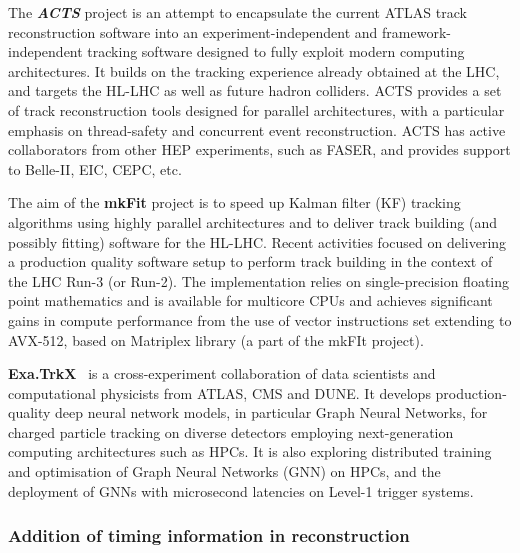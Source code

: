 The \emph{\textbf{ACTS}} project \cite{Ai:2019kze,Gumpert_2017} is an attempt to encapsulate
the current ATLAS track reconstruction software into an
experiment-independent and framework-independent tracking software
designed to fully exploit modern computing architectures. It builds on
the tracking experience already obtained at the LHC, and targets the
HL-LHC as well as future hadron colliders. ACTS provides a set of track
reconstruction tools designed for parallel architectures, with a
particular emphasis on thread-safety and concurrent event
reconstruction. ACTS has active collaborators from other HEP
experiments, such as FASER, and provides support to Belle-II, EIC, CEPC,
etc.

The aim of the \textbf{mkFit} project is to speed up Kalman filter (KF)
tracking algorithms using highly parallel architectures and to deliver
track building (and possibly fitting) software for the HL-LHC. Recent
activities focused on delivering a production quality software setup to
perform track building in the context of the LHC Run-3 (or Run-2). The
implementation relies on single-precision floating point mathematics and is
available for multicore CPUs and achieves significant gains in compute
performance from the use of vector instructions set extending to
AVX-512, based on Matriplex library (a part of the mkFIt project).

\textbf{Exa.TrkX}~\cite{Ju:2020xty} is a cross-experiment collaboration of data scientists
and computational physicists from ATLAS, CMS and DUNE. It develops
production-quality deep neural network models, in particular Graph
Neural Networks, for charged particle tracking on diverse detectors
employing next-generation computing architectures such as HPCs. It is
also exploring distributed training and optimisation of Graph Neural
Networks (GNN) on HPCs, and the deployment of GNNs with microsecond
latencies on Level-1 trigger systems.

\hypertarget{addition-of-timing-information-in-reconstruction}{%
\subsubsection{Addition of timing information in
reconstruction}\label{addition-of-timing-information-in-reconstruction}}

